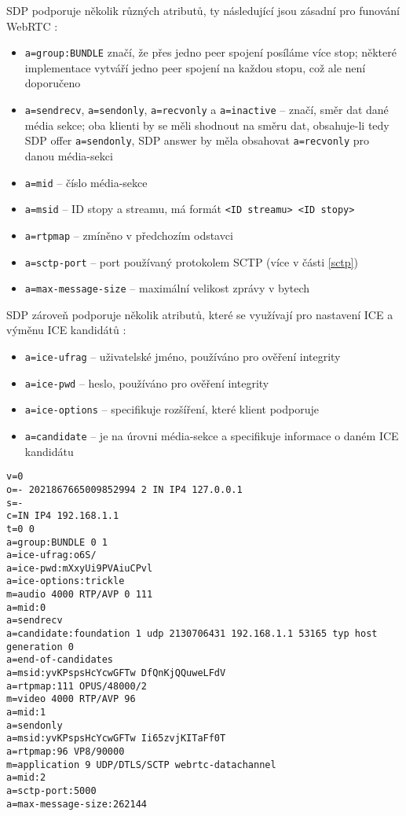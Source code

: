 SDP podporuje několik různých atributů, ty následující jsou zásadní pro funování
WebRTC \cite{WebRTCForTheCurious,IETF-RFC8866,IETF-RFC5888,IETF-RFC8841}:
\begin{itemize}
	\item \texttt{a=group:BUNDLE} značí, že přes jedno peer spojení
	      posíláme více stop; některé implementace vytváří jedno peer spojení na
	      každou stopu, což ale není doporučeno
	\item \texttt{a=sendrecv}, \texttt{a=sendonly},
	      \texttt{a=recvonly} a \texttt{a=inactive} --
	      značí, směr dat dané média sekce; oba klienti by se měli shodnout na
	      směru dat, obsahuje-li tedy SDP offer \texttt{a=sendonly},
	      SDP answer by měla obsahovat \texttt{a=recvonly} pro danou
	      média-sekci
	\item \texttt{a=mid} -- číslo média-sekce
	\item \texttt{a=msid} -- ID stopy a streamu, má formát
	      \texttt{<ID streamu> <ID stopy>}
	\item \texttt{a=rtpmap} -- zmíněno v předchozím odstavci
	\item \texttt{a=sctp-port} -- port používaný protokolem SCTP (více
	      v části \ref{sctp})
	\item \texttt{a=max-message-size} -- maximální velikost zprávy v
	      bytech
\end{itemize}

SDP zároveň podporuje několik atributů, které se využívají pro nastavení ICE a
výměnu ICE kandidátů \cite{WebRTCForTheCurious,IETF-RFC8839}:
\begin{itemize}
	\item \texttt{a=ice-ufrag} -- uživatelské jméno, používáno pro
	ověření integrity
	\item \texttt{a=ice-pwd} -- heslo, používáno pro ověření integrity
	\item \texttt{a=ice-options} -- specifikuje rozšíření, které
	klient podporuje
	\item \texttt{a=candidate} -- je na úrovni média-sekce a
	specifikuje informace o daném ICE kandidátu
\end{itemize}

\begin{verbatim}
v=0
o=- 2021867665009852994 2 IN IP4 127.0.0.1
s=-
c=IN IP4 192.168.1.1
t=0 0
a=group:BUNDLE 0 1
a=ice-ufrag:o6S/
a=ice-pwd:mXxyUi9PVAiuCPvl
a=ice-options:trickle
m=audio 4000 RTP/AVP 0 111
a=mid:0
a=sendrecv
a=candidate:foundation 1 udp 2130706431 192.168.1.1 53165 typ host generation 0
a=end-of-candidates
a=msid:yvKPspsHcYcwGFTw DfQnKjQQuweLFdV
a=rtpmap:111 OPUS/48000/2
m=video 4000 RTP/AVP 96
a=mid:1
a=sendonly
a=msid:yvKPspsHcYcwGFTw Ii65zvjKITaFf0T
a=rtpmap:96 VP8/90000
m=application 9 UDP/DTLS/SCTP webrtc-datachannel
a=mid:2
a=sctp-port:5000
a=max-message-size:262144
\end{verbatim}

